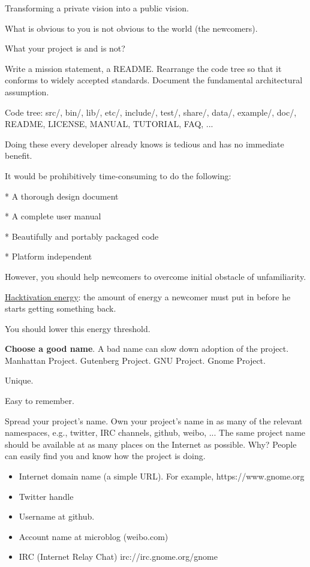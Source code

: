 \documentclass[landscape,30pt]{foils}
\begin{document}
Transforming a private vision into a public vision.

What is obvious to you is not obvious to the world (the newcomers).

What your project is and is not?

Write a mission statement, a README.  Rearrange the code tree so that it conforms to widely accepted standards.  Document the  fundamental architectural assumption.

Code tree: src/, bin/, lib/, etc/, include/, test/, share/, data/, example/, doc/, README, LICENSE, MANUAL, TUTORIAL, FAQ, ...

Doing these every developer already knows is tedious and has no immediate benefit.


It would be prohibitively time-consuming to do the following:

* A thorough design document

* A complete user manual

* Beautifully and portably packaged code

* Platform independent

However, you should help newcomers to overcome initial obstacle of unfamiliarity.

\underline{Hacktivation energy}: the amount of energy a newcomer must put in before he starts getting something back.

You should lower this energy threshold.


{\bf Choose a good name}.   A bad name can slow down adoption of the project.  Manhattan Project. Gutenberg Project. GNU Project. Gnome Project.

Unique.

Easy to remember.


Spread your project's name.  Own your project's name in as many of the relevant namespaces, e.g., twitter, IRC channels, github, weibo, ...  The same project name should be available at as many places on the Internet as possible.  Why?  People can easily find you and know how the project is doing.

\begin{itemize}
\item Internet domain name (a simple URL). For example,  https://www.gnome.org
\item Twitter handle
\item Username at github.
\item Account name at microblog (weibo.com)
\item IRC (Internet Relay Chat)  irc://irc.gnome.org/gnome
\end{itemize}
\end{document}
